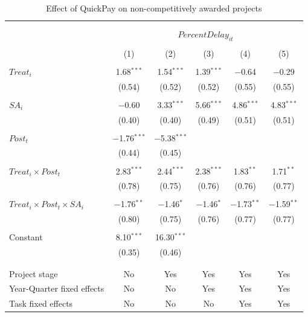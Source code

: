 \documentclass[
]{article}
\begin{document}
\begin{table}[H] \centering 
  \caption{Effect of QuickPay on non-competitively awarded projects} 
  \label{} 
\small 
\begin{tabular}{@{\extracolsep{-2pt}}lccccc} 
\\[-1.8ex]\hline 
\hline \\[-1.8ex] 
\\[-1.8ex] & \multicolumn{5}{c}{$PercentDelay_{it}$  } \\ 
\\[-1.8ex] & (1) & (2) & (3) & (4) & (5)\\ 
\hline \\[-1.8ex] 
 $Treat_i$ & 1.68$^{***}$ & 1.54$^{***}$ & 1.39$^{***}$ & $-$0.64 & $-$0.29 \\ 
  & (0.54) & (0.52) & (0.52) & (0.55) & (0.55) \\ 
  & & & & & \\ 
 $SA_i$ & $-$0.60 & 3.33$^{***}$ & 5.66$^{***}$ & 4.86$^{***}$ & 4.83$^{***}$ \\ 
  & (0.40) & (0.40) & (0.49) & (0.51) & (0.51) \\ 
  & & & & & \\ 
 $Post_t$ & $-$1.76$^{***}$ & $-$5.38$^{***}$ &  &  &  \\ 
  & (0.44) & (0.45) &  &  &  \\ 
  & & & & & \\ 
 $Treat_i \times Post_t$ & 2.83$^{***}$ & 2.44$^{***}$ & 2.38$^{***}$ & 1.83$^{**}$ & 1.71$^{**}$ \\ 
  & (0.78) & (0.75) & (0.76) & (0.76) & (0.77) \\ 
  & & & & & \\ 
 $Treat_i \times Post_t \times SA_i $ & $-$1.76$^{**}$ & $-$1.46$^{*}$ & $-$1.46$^{*}$ & $-$1.73$^{**}$ & $-$1.59$^{**}$ \\ 
  & (0.80) & (0.75) & (0.76) & (0.77) & (0.77) \\ 
  & & & & & \\ 
 Constant & 8.10$^{***}$ & 16.30$^{***}$ &  &  &  \\ 
  & (0.35) & (0.46) &  &  &  \\ 
  & & & & & \\ 
\hline \\[-1.8ex] 
Project stage & No & Yes & Yes & Yes & Yes \\ 
Year-Quarter fixed effects & No & No & Yes & Yes & Yes \\ 
Task fixed effects & No & No & No & Yes & Yes \\ 

\end{tabular}
\end{table}
\end{document}
